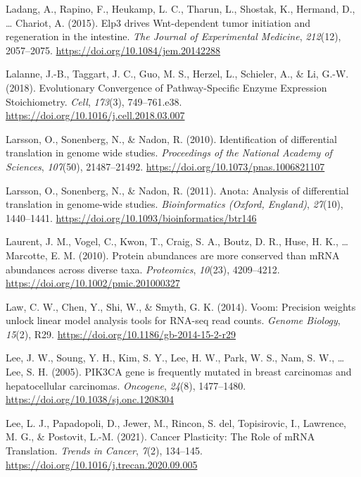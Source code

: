 \documentclass[12pt,openany]{book}
\begin{document}
\hypertarget{ref-Ladang2015}{}
Ladang, A., Rapino, F., Heukamp, L. C., Tharun, L., Shostak, K.,
Hermand, D., \ldots{} Chariot, A. (2015). Elp3 drives Wnt-dependent
tumor initiation and regeneration in the intestine. \emph{The Journal of
Experimental Medicine}, \emph{212}(12), 2057--2075.
\url{https://doi.org/10.1084/jem.20142288}

\hypertarget{ref-Lalanne2018}{}
Lalanne, J.-B., Taggart, J. C., Guo, M. S., Herzel, L., Schieler, A., \&
Li, G.-W. (2018). Evolutionary Convergence of Pathway-Specific Enzyme
Expression Stoichiometry. \emph{Cell}, \emph{173}(3), 749--761.e38.
\url{https://doi.org/10.1016/j.cell.2018.03.007}

\hypertarget{ref-Larsson2010}{}
Larsson, O., Sonenberg, N., \& Nadon, R. (2010). Identification of
differential translation in genome wide studies. \emph{Proceedings of
the National Academy of Sciences}, \emph{107}(50), 21487--21492.
\url{https://doi.org/10.1073/pnas.1006821107}

\hypertarget{ref-Larsson2011}{}
Larsson, O., Sonenberg, N., \& Nadon, R. (2011). Anota: Analysis of
differential translation in genome-wide studies. \emph{Bioinformatics
(Oxford, England)}, \emph{27}(10), 1440--1441.
\url{https://doi.org/10.1093/bioinformatics/btr146}

\hypertarget{ref-Laurent2010}{}
Laurent, J. M., Vogel, C., Kwon, T., Craig, S. A., Boutz, D. R., Huse,
H. K., \ldots{} Marcotte, E. M. (2010). Protein abundances are more
conserved than mRNA abundances across diverse taxa. \emph{Proteomics},
\emph{10}(23), 4209--4212. \url{https://doi.org/10.1002/pmic.201000327}

\hypertarget{ref-Law2014}{}
Law, C. W., Chen, Y., Shi, W., \& Smyth, G. K. (2014). Voom: Precision
weights unlock linear model analysis tools for RNA-seq read counts.
\emph{Genome Biology}, \emph{15}(2), R29.
\url{https://doi.org/10.1186/gb-2014-15-2-r29}

\hypertarget{ref-Lee2005}{}
Lee, J. W., Soung, Y. H., Kim, S. Y., Lee, H. W., Park, W. S., Nam, S.
W., \ldots{} Lee, S. H. (2005). PIK3CA gene is frequently mutated in
breast carcinomas and hepatocellular carcinomas. \emph{Oncogene},
\emph{24}(8), 1477--1480. \url{https://doi.org/10.1038/sj.onc.1208304}

\hypertarget{ref-Lee2021}{}
Lee, L. J., Papadopoli, D., Jewer, M., Rincon, S. del, Topisirovic, I.,
Lawrence, M. G., \& Postovit, L.-M. (2021). Cancer Plasticity: The Role
of mRNA Translation. \emph{Trends in Cancer}, \emph{7}(2), 134--145.
\url{https://doi.org/10.1016/j.trecan.2020.09.005}
\end{document}
